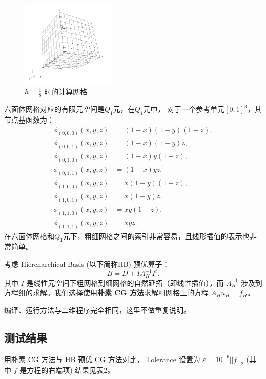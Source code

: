 \documentclass[lang=cn,11pt,a4paper]{elegantpaper}
\begin{document}
\vspace{-1em}
\begin{figure}[H]
    \centering
    \includegraphics[width=0.4\textwidth]{png/mesh-3D.png}
    \caption{\small $h=\frac{1}{8}$ 时的计算网格}
\end{figure}

六面体网格对应的有限元空间是$Q_1$元，在$Q_1$元中，
对于一个参考单元$[0,1]^3$，其节点基函数为：
\begin{align*}
    \phi_{(0,0,0)}(x,y,z)&=(1-x)(1-y)(1-z),\\
    \phi_{(0,0,1)}(x,y,z)&=(1-x)(1-y)z,\\
    \phi_{(0,1,0)}(x,y,z)&=(1-x)y(1-z),\\
    \phi_{(0,1,1)}(x,y,z)&=(1-x)yz,\\
    \phi_{(1,0,0)}(x,y,z)&=x(1-y)(1-z),\\
    \phi_{(1,0,1)}(x,y,z)&=x(1-y)z,\\
    \phi_{(1,1,0)}(x,y,z)&=xy(1-z),\\
    \phi_{(1,1,1)}(x,y,z)&=xyz.
\end{align*}
在六面体网格和$Q_1$元下，粗细网格之间的索引非常容易，且线形插值的表示也非常简单。

考虑 Hiercharchical Basis (以下简称HB) 预优算子：
\begin{equation}
    B=D+IA_H^{-1}I^t.
\end{equation}
其中 $I$ 是线性元空间下粗网格到细网格的自然延拓（即线性插值），而 $A_H^{-1}$ 涉及到
方程组的求解。我们选择使用\textbf{朴素 CG 方法}求解粗网格上的方程 $A_Hu_H=f_H$。

编译、运行方法与二维程序完全相同，这里不做重复说明。

\subsection{测试结果}

用朴素 CG 方法与 HB 预优 CG 方法对比，
Tolerance 设置为 $\varepsilon=10^{-6}||f||_2$ (其中 $f$ 是方程的右端项) 结果见表2。
\end{document}

